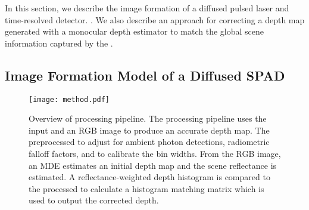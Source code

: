 In this section, we describe the image formation of a diffused pulsed laser and time-resolved detector. . We also describe an approach for correcting a depth map generated with a monocular depth estimator to match the global scene information captured by the .


\subsection{Image Formation Model of a Diffused SPAD}

\begin{figure}[t!]
  \centering
  \texttt{[image: method.pdf]}
  \caption{Overview of processing pipeline. The processing pipeline uses
      the input  and an RGB image to produce an accurate depth
      map. The  preprocessed to adjust for ambient photon
      detections, radiometric falloff factors, and to calibrate the bin widths.
      From the RGB image, an MDE estimates an initial depth map
      and the scene reflectance is estimated. A reflectance-weighted
      depth histogram is compared to the processed  to
      calculate a histogram matching matrix which is used to output the corrected depth. 
  }
  \label{fig:pipeline}
\end{figure}

